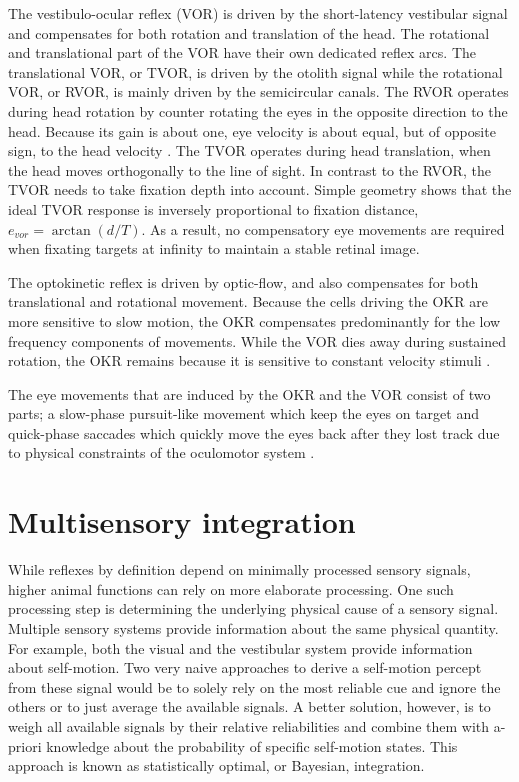 The vestibulo-ocular reflex (VOR) is driven by the short-latency vestibular signal and compensates for both rotation and translation of the head. The rotational and translational part of the VOR have their own dedicated reflex arcs. The translational VOR, or TVOR, is driven by the otolith signal while the rotational VOR, or RVOR, is mainly driven by the semicircular canals. The RVOR operates during head rotation by counter rotating the eyes in the opposite direction to the head. Because its gain is about one, eye velocity is about equal, but of opposite sign, to the head velocity \cite{goldberg2012}. The TVOR operates during head translation, when the head moves orthogonally to the line of sight. In contrast to the RVOR, the TVOR needs to take fixation depth into account. Simple geometry shows that the ideal TVOR response is inversely proportional to fixation distance, $e_{vor} = \arctan(d/T)$. As a result, no compensatory eye movements are required when fixating targets at infinity to maintain a stable retinal image.

The optokinetic reflex is driven by optic-flow, and also compensates for both translational and rotational movement. Because the cells driving the OKR are more sensitive to slow motion, the OKR compensates predominantly for the low frequency components of movements. While the VOR dies away during sustained rotation, the OKR remains because it is sensitive to constant velocity stimuli \cite{soodak1988}.

The eye movements that are induced by the OKR and the VOR consist of two parts; a slow-phase pursuit-like movement which keep the eyes on target and quick-phase saccades which quickly move the eyes back after they lost track due to physical constraints of the oculomotor system \cite{goldberg2012}.

\section{Multisensory integration}

While reflexes by definition depend on minimally processed sensory signals, higher animal functions can rely on more elaborate processing. One such processing step is determining the underlying physical cause of a sensory signal. Multiple sensory systems provide information about the same physical quantity. For example, both the visual and the vestibular system provide information about self-motion. Two very naive approaches to derive a self-motion percept from these signal would be to solely rely on the most reliable cue and ignore the others or to just average the available signals. A better solution, however, is to weigh all available signals by their relative reliabilities and combine them with a-priori knowledge about the probability of specific self-motion states. This approach is known as statistically optimal, or Bayesian, integration.

